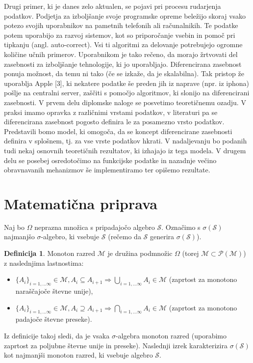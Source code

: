 \documentclass[12pt,a4paper]{amsart}
\theoremstyle{definition} %
\newtheorem{definicija}{Definicija}[section]
\theoremstyle{plain} %
\begin{document}
\newline
\newline
Drugi primer, ki je danes zelo aktualen, se pojavi pri procesu rudarjenja podatkov. Podjetja za izboljšanje svoje programske opreme beležijo skoraj vsako potezo svojih uporabnikov na pametnih telefonih ali računalnikih. Te podatke potem uporabijo za razvoj sistemov, kot so priporočanje vsebin in pomoč pri tipkanju (angl. auto-correct). Vsi ti algoritmi za delovanje potrebujejo ogromne količine učnih primerov. Uporabnikom je tako rečeno, da morajo žrtvovati del zasebnosti za izboljšanje tehnologije, ki jo uporabljajo. Diferencirana zasebnost ponuja možnost, da temu ni tako (če se izkaže, da je skalabilna). Tak pristop že uporablja Apple [3], ki nekatere podatke še preden jih iz naprave (npr. iz iphona) pošlje na centralni server, zaščiti s pomočjo algoritmov, ki slonijo na diferencirani zasebnosti. 
\newline
\newline
V prvem delu diplomske naloge se posvetimo teoretičnemu ozadju. V praksi imamo opravka z različnimi vrstami podatkov, v literaturi pa se diferencirana zasebnost pogosto definira le za posamezno vrsto podatkov. Predstavili bomo model, ki omogoča, da se koncept diferencirane zasebnosti definira v splošnem, tj. za vse vrste podatkov hkrati. V nadaljevanju bo podanih tudi nekaj osnovnih teoretičnih rezultatov, ki izhajajo iz tega modela. V drugem delu se posebej osredotočimo na funkcijske podatke in nazadnje večino obravnavanih mehanizmov še implementiramo ter opišemo rezultate.

\section{Matematična priprava}

Naj bo $\Omega$ neprazna množica s pripadajočo algebro $\mathcal{S}$. Označimo s $\sigma(\mathcal{S})$ najmanjšo $\sigma$-algebro, ki vsebuje $\mathcal{S}$ (rečemo da $\mathcal{S}$ generira $\sigma(\mathcal{S})$).
\begin{definicija}
Monoton razred $\mathcal{M}$ je družina podmnožic $\Omega$ (torej $\mathcal{M} \subset \mathcal{P(\mathcal{M})}$) z naslednjima lastnostima:
\begin{itemize}
\item  $\{A_i\}_{i=1,...\infty} \in \mathcal{M}, A_i \subseteq A_{i+1} \Rightarrow \bigcup_{i=1,...\infty} A_i \in \mathcal{M}$ (zaprtost za monotono naraščajoče števne unije),
\item  $\{A_i\}_{i=1,...\infty} \in \mathcal{M}, A_i \supseteq A_{i+1} \Rightarrow \bigcap_{i=1,...\infty} A_i \in \mathcal{M}$ (zaprtost za monotono padajoče števne preseke).
\end{itemize}
\end{definicija}
Iz definicije takoj sledi, da je vsaka $\sigma$-algebra monoton razred (uporabimo zaprtost za poljubne števne unije in preseke). Naslednji izrek karakterizira $\sigma(\mathcal{S})$ kot najmanjši monoton razred, ki vsebuje algebro $\mathcal{S}$.
\end{document}
